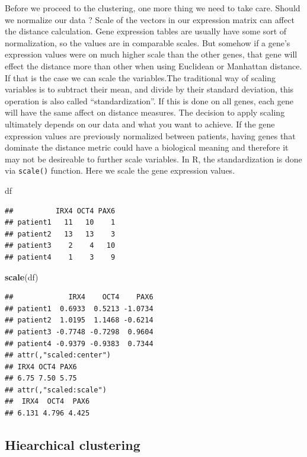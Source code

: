 \documentclass[12pt,]{krantz}
\newenvironment{Shaded}{\begin{snugshade}}{\end{snugshade}}
\newcommand{\KeywordTok}[1]{\textcolor[rgb]{0.13,0.29,0.53}{\textbf{#1}}}
\newcommand{\NormalTok}[1]{#1}
\begin{document}
Before we proceed to the clustering, one more thing we need to take care. Should we normalize our data ? Scale of the vectors in our expression matrix can affect the distance calculation. Gene expression tables are usually have some sort of normalization, so the values are in comparable scales. But somehow if a gene's expression values were on much higher scale than the other genes, that gene will effect the distance more than other when using Euclidean or Manhattan distance. If that is the case we can scale the variables.The traditional way of scaling variables is to subtract their mean, and divide by their standard deviation, this operation is also called ``standardization''. If this is done on all genes, each gene will have the same affect on distance measures. The decision to apply scaling ultimately depends on our data and what you want to achieve. If the gene expression values are previously normalized between patients, having genes that dominate the distance metric could have a biological meaning and therefore it may not be desireable to further scale variables. In R, the standardization is done via \texttt{scale()} function. Here we scale the gene expression values.

\begin{Shaded}
\begin{Highlighting}[]
\NormalTok{df}
\end{Highlighting}
\end{Shaded}

\begin{verbatim}
##          IRX4 OCT4 PAX6
## patient1   11   10    1
## patient2   13   13    3
## patient3    2    4   10
## patient4    1    3    9
\end{verbatim}

\begin{Shaded}
\begin{Highlighting}[]
\KeywordTok{scale}\NormalTok{(df)}
\end{Highlighting}
\end{Shaded}

\begin{verbatim}
##             IRX4    OCT4    PAX6
## patient1  0.6933  0.5213 -1.0734
## patient2  1.0195  1.1468 -0.6214
## patient3 -0.7748 -0.7298  0.9604
## patient4 -0.9379 -0.9383  0.7344
## attr(,"scaled:center")
## IRX4 OCT4 PAX6 
## 6.75 7.50 5.75 
## attr(,"scaled:scale")
##  IRX4  OCT4  PAX6 
## 6.131 4.796 4.425
\end{verbatim}

\hypertarget{hiearchical-clustering}{%
\subsection{Hiearchical clustering}\label{hiearchical-clustering}}
\end{document}
